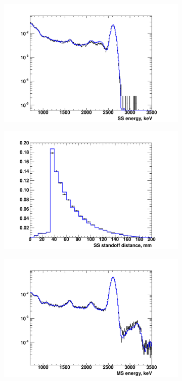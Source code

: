 \documentclass[herrin-thesis.tex]{subfiles}
\begin{document}
\begin{figure}[htb]
\centering
	\begin{subfigure}[c]{0.48\textwidth}
	\centering
	\includegraphics[width=\textwidth]{./plots/analysis_shape_agreement_E_ThS5SSlog.pdf}
	\end{subfigure}\hfill%
	\begin{subfigure}[c]{0.48\textwidth}
	\centering
	\includegraphics[width=\textwidth]{./plots/analysis_shape_agreement_sd_ThS5SSlin.pdf}
	\end{subfigure}
	\begin{subfigure}[c]{0.48\textwidth}
	\centering
	\includegraphics[width=\textwidth]{./plots/analysis_shape_agreement_E_ThS5MSlog.pdf}

\end{subfigure}
\end{figure}
\end{document}

